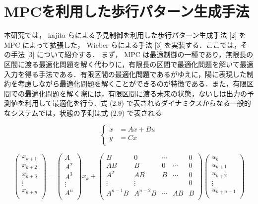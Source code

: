\section{MPCを利用した歩行パターン生成手法}
本研究では， kajita らによる予見制御を利用した歩行パターン生成手法 [2] を MPC によって拡張した， Wieber らによる手法 [3] を実装する．ここでは，その手法 [3] について紹介する．
まず， MPC は最適制御の一種であり，無限長の区間に渡る最適化問題を解く代わりに，有限長の区間で最適化問題を解いて最適入力を得る手法である．有限区間の最適化問題であるがゆえに，陽に表現した制約を考慮しながら最適化問題を解くことができるのが特徴である．また，有限区間での最適化問題を解く際には，有限区間に渡る未来の状態，ないしは出力の予測値を利用して最適化を行う．式 (2.8) で表されるダイナミクスからなる一般的なシステムでは，状態の予測は式 (2.9) で表される

\begin{equation}
     \left\{\begin{aligned}\dot{x} &= Ax + Bu \\ y &= Cx \\\end{aligned}\right.
\end{equation}

\begin{equation}
     \left(\begin{matrix}x_{k+1}\\x_{k+2}\\x_{k+3}\\\vdots\\x_{k+n}\\\end{matrix}\right)=\left(\begin{matrix}A\\A^2\\A^3\\\vdots\\A^n\\\end{matrix}\right)x_k+\left(\begin{matrix}B&0&\cdots&&0\\AB&B&0&\cdots&0\\A^2&AB&B&\cdots&0\\\vdots&\vdots&&&0\\A^{n-1}B&A^{n-2}B&\cdots&AB&B\\\end{matrix}\right)\left(\begin{matrix}u_k\\u_{k+1}\\u_{k+2}\\\vdots\\u_{k+n-1}\\\end{matrix}\right)
\end{equation}

